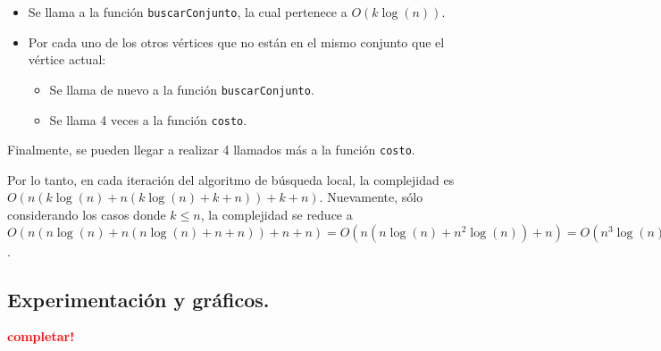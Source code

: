\begin{itemize}
  \item Se llama a la función \texttt{buscarConjunto}, la cual pertenece a
  $O(k\log(n))$.

  \item Por cada uno de los otros vértices que no están en el mismo conjunto
  que el vértice actual:

  \begin{itemize}
    \item Se llama de nuevo a la función \texttt{buscarConjunto}.

    \item Se llama 4 veces a la función \texttt{costo}.
  \end{itemize}
\end{itemize}

Finalmente, se pueden llegar a realizar 4 llamados más a la función
\texttt{costo}.

Por lo tanto, en cada iteración del algoritmo de búsqueda local, la complejidad
es $O(n (k\log(n) + n (k\log(n) + k + n)) + k + n)$. Nuevamente, sólo
considerando los casos donde $k \le n$, la complejidad se reduce a
$O(n(n\log(n) + n (n\log(n) + n + n)) + n + n) = O(n (n\log(n) + n^2 \log(n)) + n) = O(n^3 \log(n))$.


\newpage \subsection{Experimentación y gráficos.}
\vspace*{0.3cm}

\textcolor{red}{\textbf{completar!}}

